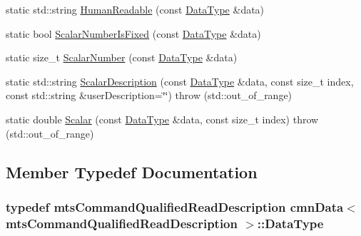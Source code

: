 \begin{DoxyCompactItemize}
\item 
static std\+::string \hyperlink{classcmn_data_3_01mts_command_qualified_read_description_01_4_a018ea56637b945c3af64da15a4bbca0e}{Human\+Readable} (const \hyperlink{classcmn_data_3_01mts_command_qualified_read_description_01_4_a806c74676540892a3a54aed2f6e4d040}{Data\+Type} \&data)
\item 
static bool \hyperlink{classcmn_data_3_01mts_command_qualified_read_description_01_4_ac8acae530d1599e8148c45c05e3c4f99}{Scalar\+Number\+Is\+Fixed} (const \hyperlink{classcmn_data_3_01mts_command_qualified_read_description_01_4_a806c74676540892a3a54aed2f6e4d040}{Data\+Type} \&data)
\item 
static size\+\_\+t \hyperlink{classcmn_data_3_01mts_command_qualified_read_description_01_4_a05cd8d24693bdf3c129ec19a026a8fcd}{Scalar\+Number} (const \hyperlink{classcmn_data_3_01mts_command_qualified_read_description_01_4_a806c74676540892a3a54aed2f6e4d040}{Data\+Type} \&data)
\item 
static std\+::string \hyperlink{classcmn_data_3_01mts_command_qualified_read_description_01_4_a82fe4fcde4e91bf5a6a4c077dd41b9d5}{Scalar\+Description} (const \hyperlink{classcmn_data_3_01mts_command_qualified_read_description_01_4_a806c74676540892a3a54aed2f6e4d040}{Data\+Type} \&data, const size\+\_\+t index, const std\+::string \&user\+Description=\char`\"{}\char`\"{})  throw (std\+::out\+\_\+of\+\_\+range)
\item 
static double \hyperlink{classcmn_data_3_01mts_command_qualified_read_description_01_4_a430b5c608975a70434ee3c564cb0377e}{Scalar} (const \hyperlink{classcmn_data_3_01mts_command_qualified_read_description_01_4_a806c74676540892a3a54aed2f6e4d040}{Data\+Type} \&data, const size\+\_\+t index)  throw (std\+::out\+\_\+of\+\_\+range)
\end{DoxyCompactItemize}


\subsection{Member Typedef Documentation}
\hypertarget{classcmn_data_3_01mts_command_qualified_read_description_01_4_a806c74676540892a3a54aed2f6e4d040}{}
\subsubsection[{Data\+Type}]{\setlength{\rightskip}{0pt plus 5cm}typedef {\bf mts\+Command\+Qualified\+Read\+Description} {\bf cmn\+Data}$<$ {\bf mts\+Command\+Qualified\+Read\+Description} $>$\+::{\bf Data\+Type}}\label{classcmn_data_3_01mts_command_qualified_read_description_01_4_a806c74676540892a3a54aed2f6e4d040}


